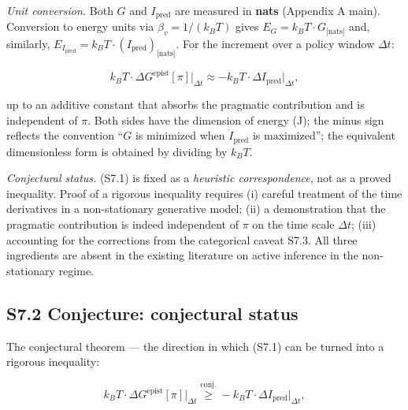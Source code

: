 \documentclass[pdflatex,sn-mathphys-ay]{sn-jnl}
\begin{document}
\emph{Unit conversion.} Both \(G\) and \(I_{\text{pred}}\) are measured in \textbf{nats} (Appendix A main). Conversion to energy units via \(\beta_v = 1/(k_B T)\) gives \(E_G = k_B T \cdot G_{\text{[nats]}}\) and, similarly, \(E_{I_{\text{pred}}} = k_B T \cdot (I_{\text{pred}})_{\text{[nats]}}\). For the increment over a policy window \(\Delta t\):



\begin{equation}k_B T \cdot \Delta G^{\text{epist}}[\pi]\bigr|_{\Delta t} \approx -k_B T \cdot \Delta I_{\text{pred}}\bigr|_{\Delta t}, \tag{S7.1}\end{equation}



up to an additive constant that absorbs the pragmatic contribution and is independent of \(\pi\). Both sides have the dimension of energy (J); the minus sign reflects the convention ``\(G\) is minimized when \(\dot{I}_{\text{pred}}\) is maximized''; the equivalent dimensionless form is obtained by dividing by \(k_B T\).



\emph{Conjectural status.} (S7.1) is fixed as a \emph{heuristic correspondence}, not as a proved inequality. Proof of a rigorous inequality requires (i) careful treatment of the time derivatives in a non-stationary generative model; (ii) a demonstration that the pragmatic contribution is indeed independent of \(\pi\) on the time scale \(\Delta t\); (iii) accounting for the corrections from the categorical caveat S7.3. All three ingredients are absent in the existing literature on active inference in the non-stationary regime.



\subsection*{S7.2 Conjecture: conjectural status}\label{s7.2-conjecture-conjectural-status}



The conjectural theorem --- the direction in which (S7.1) can be turned into a rigorous inequality:



\begin{equation}k_B T \cdot \Delta G^{\text{epist}}[\pi]\bigr|_{\Delta t} \stackrel{\text{conj.}}{\ge} -k_B T \cdot \Delta I_{\text{pred}}\bigr|_{\Delta t}, \tag{S7.2}\end{equation}
\end{document}
